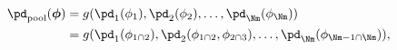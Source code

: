 \begin{align}
  \pd_{\text{pool}}(\boldsymbol{\phi})
  &= g(\pd_{1}(\phi_{1}), \pd_{2}(\phi_{2}), \ldots, \pd_{\Nm}(\phi_{\Nm})) \\
  &= g(\pd_{1}(\phi_{1 \cap 2}), \pd_{2}(\phi_{1 \cap 2}, \phi_{2 \cap 3}), \ldots, \pd_{\Nm}(\phi_{\Nm - 1 \cap \Nm})),
  \label{eqn:pooled-prior-general-def-two}
\end{align}